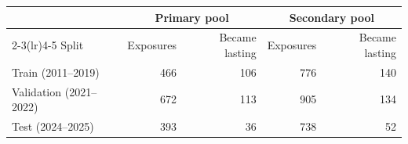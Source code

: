 \begin{tabular}{lrrrr}\toprule
 & \multicolumn{2}{c}{Primary pool} & \multicolumn{2}{c}{Secondary pool}\\
\cmidrule(lr){2-3}\cmidrule(lr){4-5}
Split & Exposures & Became lasting & Exposures & Became lasting\\\midrule
Train (2011--2019) & 466 & 106 & 776 & 140\\
Validation (2021--2022) & 672 & 113 & 905 & 134\\
Test (2024--2025) & 393 & 36 & 738 & 52\\
\bottomrule
\end{tabular}
